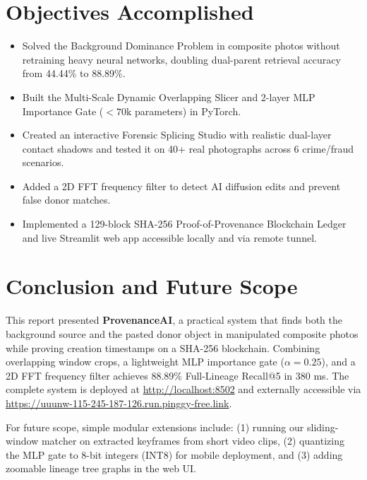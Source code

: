 \documentclass[12pt,a4paper]{article}
\begin{document}
\section{Objectives Accomplished}
\begin{itemize}
    \item Solved the Background Dominance Problem in composite photos without retraining heavy neural networks, doubling dual-parent retrieval accuracy from 44.44\% to 88.89\%.
    \item Built the Multi-Scale Dynamic Overlapping Slicer and 2-layer MLP Importance Gate ($<70\text{k}$ parameters) in PyTorch.
    \item Created an interactive Forensic Splicing Studio with realistic dual-layer contact shadows and tested it on 40+ real photographs across 6 crime/fraud scenarios.
    \item Added a 2D FFT frequency filter to detect AI diffusion edits and prevent false donor matches.
    \item Implemented a 129-block SHA-256 Proof-of-Provenance Blockchain Ledger and live Streamlit web app accessible locally and via remote tunnel.
\end{itemize}

\section{Conclusion and Future Scope}
This report presented \textbf{ProvenanceAI}, a practical system that finds both the background source and the pasted donor object in manipulated composite photos while proving creation timestamps on a SHA-256 blockchain. Combining overlapping window crops, a lightweight MLP importance gate ($\alpha=0.25$), and a 2D FFT frequency filter achieves 88.89\% Full-Lineage Recall@5 in 380 ms. The complete system is deployed at \url{http://localhost:8502} and externally accessible via \url{https://uuunw-115-245-187-126.run.pinggy-free.link}.

For future scope, simple modular extensions include: (1) running our sliding-window matcher on extracted keyframes from short video clips, (2) quantizing the MLP gate to 8-bit integers (INT8) for mobile deployment, and (3) adding zoomable lineage tree graphs in the web UI.
\end{document}

